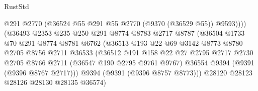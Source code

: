 \begin{lexlean}{RustStd}
\begin{coremodule}
                                          @291
                                          @2770
                                          (@36524 @55 @291 @55 @2770 (@9370 (@36529 @55)) @9593))))
                                    (@36493
                                      @2353
                                      @235
                                      @250
                                      @291
                                      @8774
                                      @8783
                                      @2717
                                      @8787
                                      (@36504
                                        @1733
                                        @70
                                        @291
                                        @8774
                                        @8781
                                        @6762
                                        (@36513
                                          @193
                                          @22
                                          @69
                                          @3142
                                          @8773
                                          @8780
                                          @2705
                                          @8756
                                          @2711
                                          @36533
                                          (@36512
                                            @191
                                            @158
                                            @22
                                            @27
                                            @2795
                                            @2717
                                            @2730
                                            @2705
                                            @8766
                                            @2711
                                            (@36547 @190 @2795 @9761 @9767)
                                            @36554
                                            @9394
                                            (@9391 (@9396 @8767 @2717)))
                                          @9394
                                          (@9391 (@9396 @8757 @8773)))
                                        @28120
                                        @28123
                                        @28126
                                        @28130
                                        @28135
                                        @36574)

\end{coremodule}
\end{lexlean}
